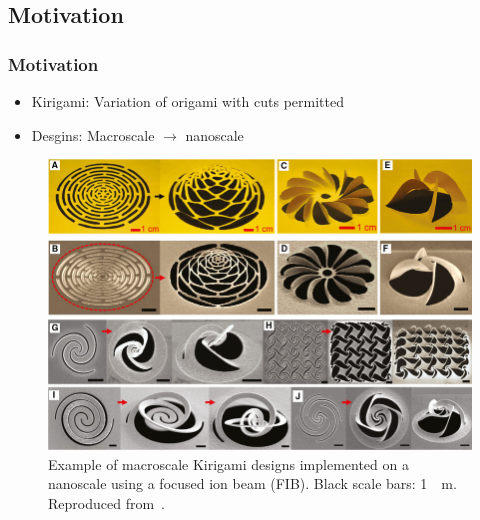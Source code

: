 \documentclass[
	10pt, %
]{beamer}
\begin{document}
\subsection{Motivation}


\begin{frame}
	\frametitle{Motivation}

	\begin{itemize}
		\item Kirigami: Variation of origami with cuts permitted
		\item Desgins: Macroscale $\to$ nanoscale
	\end{itemize}
	\vspace*{10px}

	\begin{figure}
		\includegraphics[height=0.55\textheight]{figures/kirigami_example.jpg}
		\caption{Example of macroscale Kirigami designs implemented on a nanoscale using a focused ion beam (FIB). Black scale bars: \SI{1}{\mu m}. Reproduced from~\cite{Li_2018}.}
	\end{figure}	
\end{frame}
\end{document}

